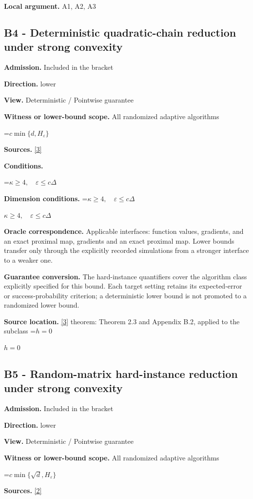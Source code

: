 \documentclass[10pt,a4paper]{article}
\newcommand{\AtlasMath}[1]{\par\begingroup\centering\setbox0=\hbox{$\displaystyle #1$}\ifdim\wd0>1.4\linewidth\typeout{ATLAS WIDE FORMULA: \the\wd0}\fi\ifdim\wd0>\linewidth\resizebox{\linewidth}{!}{\box0}\else\box0\fi\par\endgroup}
\newcommand{\AtlasInlineMath}[1]{\begingroup\setbox0=\hbox{$#1$}\ifdim\wd0>.4\linewidth\endgroup\AtlasMath{#1}\else\endgroup$#1$\fi}
\begin{document}
\textbf{Local argument.} A1, A2, A3

\subsection{B4 - Deterministic quadratic-chain reduction under strong convexity}
\textbf{Admission.} Included in the bracket

\textbf{Direction.} lower

\textbf{View.} Deterministic / Pointwise guarantee

\textbf{Witness or lower-bound scope.} All randomized adaptive algorithms

\AtlasMath{c\min\{d,H_\varepsilon\}}
\textbf{Sources.} \href{https://arxiv.org/pdf/2609.33360v2}{[3]}

\textbf{Conditions.} 
\AtlasMath{\kappa\ge4,\quad\varepsilon\le c\Delta}


\textbf{Dimension conditions.} \AtlasInlineMath{\kappa\ge4,\quad\varepsilon\le c\Delta}

\textbf{Oracle correspondence.} Applicable interfaces: function values, gradients, and an exact proximal map, gradients and an exact proximal map. Lower bounds transfer only through the explicitly recorded simulations from a stronger interface to a weaker one.

\textbf{Guarantee conversion.} The hard-instance quantifiers cover the algorithm class explicitly specified for this bound. Each target setting retains its expected-error or success-probability criterion; a deterministic lower bound is not promoted to a randomized lower bound.

\textbf{Source location.} \href{https://arxiv.org/pdf/2609.33360v2}{[3]} theorem: Theorem 2.3 and Appendix B.2, applied to the subclass \AtlasInlineMath{h=0}

\subsection{B5 - Random-matrix hard-instance reduction under strong convexity}
\textbf{Admission.} Included in the bracket

\textbf{Direction.} lower

\textbf{View.} Deterministic / Pointwise guarantee

\textbf{Witness or lower-bound scope.} All randomized adaptive algorithms

\AtlasMath{c\min\{\sqrt d,H_\varepsilon\}}
\textbf{Sources.} \href{https://arxiv.org/pdf/2609.10874}{[2]}
\end{document}
